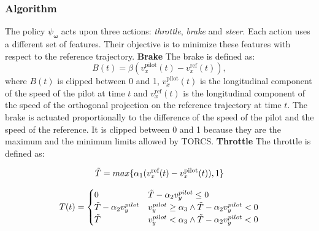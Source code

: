 \subsubsection{Algorithm}
\label{seq:rule_b_algo}
The policy $\psi_{\boldsymbol \omega}$ acts upon three actions: \textit{throttle}, \textit{brake} and \textit{steer}.
Each action uses a different set of features. Their objective is to minimize these features with respect to the reference trajectory.
\newline  \textbf{Brake} The brake is defined as:
\begin{equation}B(t)=\beta(v^{\text{pilot}}_x(t)-v^{\text{ref}}_x(t)),\end{equation} where $B(t)$ is clipped between 0 and 1, $v^{\text{pilot}}_x(t)$ is the longitudinal component of the speed of the pilot at time $t$ and $v^{\text{ref}}_x(t)$ is the longitudinal component of the speed of the orthogonal projection on the reference trajectory at time $t$.
The brake is actuated proportionally to the difference of the speed of the pilot and the speed of the reference. It is clipped between 0 and 1 because they are the maximum and the minimum limits allowed by TORCS.
\newline  \textbf{Throttle} The throttle is defined as:

\begin{equation}
    \Tilde{T}=max\{ \alpha_1(v_x^{\text{ref}}(t)-v_x^{\text{pilot}}(t)), 1 \}
\end{equation}

\begin{equation}
  T(t) =
    \begin{cases}
      0 &
      \text{$\Tilde{T}-\alpha_2 v_y^{pilot} \leq 0$} \\
      
      \Tilde{T}-\alpha_2 v_y^{pilot} &
      \text{$v_y^{pilot} \geq \alpha_3 \wedge \Tilde{T}-\alpha_2 v_y^{pilot}<0$}\\
      
      
      \Tilde{T} &
      \text{$v_y^{pilot} < \alpha_3 \wedge \Tilde{T}-\alpha_2 v_y^{pilot}<0$}\\
    \end{cases}       
\end{equation}

